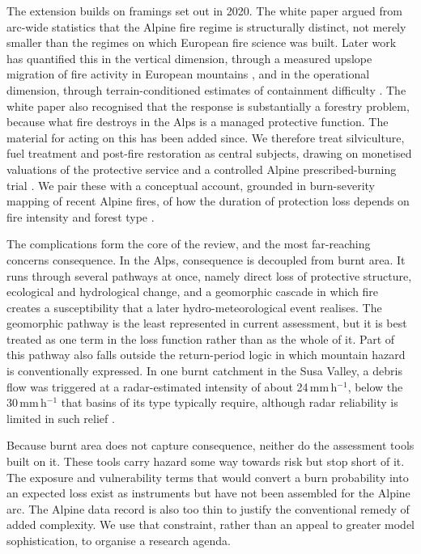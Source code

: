 \documentclass[11pt,a4paper]{article}
\begin{document}
The extension builds on framings set out in 2020. The white paper argued from arc-wide statistics that the Alpine fire regime is structurally distinct, not merely smaller than the regimes on which European fire science was built. Later work has quantified this in the vertical dimension, through a measured upslope migration of fire activity in European mountains \citep{beloiu_climatedriven_2026}, and in the operational dimension, through terrain-conditioned estimates of containment difficulty \citep{cardil_assessing_2025}. The white paper also recognised that the response is substantially a forestry problem, because what fire destroys in the Alps is a managed protective function. The material for acting on this has been added since. We therefore treat silviculture, fuel treatment and post-fire restoration as central subjects, drawing on monetised valuations of the protective service \citep{accastello_asforesee_2019, moos_climate_2021} and a controlled Alpine prescribed-burning trial \citep{gamba_prescribed_2025}. We pair these with a conceptual account, grounded in burn-severity mapping of recent Alpine fires, of how the duration of protection loss depends on fire intensity and forest type \citep{melzner_wildfire-induced_2025}.

The complications form the core of the review, and the most far-reaching concerns consequence. In the Alps, consequence is decoupled from burnt area. It runs through several pathways at once, namely direct loss of protective structure, ecological and hydrological change, and a geomorphic cascade in which fire creates a susceptibility that a later hydro-meteorological event realises. The geomorphic pathway is the least represented in current assessment, but it is best treated as one term in the loss function rather than as the whole of it. Part of this pathway also falls outside the return-period logic in which mountain hazard is conventionally expressed. In one burnt catchment in the Susa Valley, a debris flow was triggered at a radar-estimated intensity of about 24\,mm\,h$^{-1}$, below the 30\,mm\,h$^{-1}$ that basins of its type typically require, although radar reliability is limited in such relief \citep{laporta_postwildfire_2025}.

Because burnt area does not capture consequence, neither do the assessment tools built on it. These tools carry hazard some way towards risk but stop short of it. The exposure and vulnerability terms that would convert a burn probability into an expected loss exist as instruments but have not been assembled for the Alpine arc. The Alpine data record is also too thin to justify the conventional remedy of added complexity. We use that constraint, rather than an appeal to greater model sophistication, to organise a research agenda.
\end{document}
